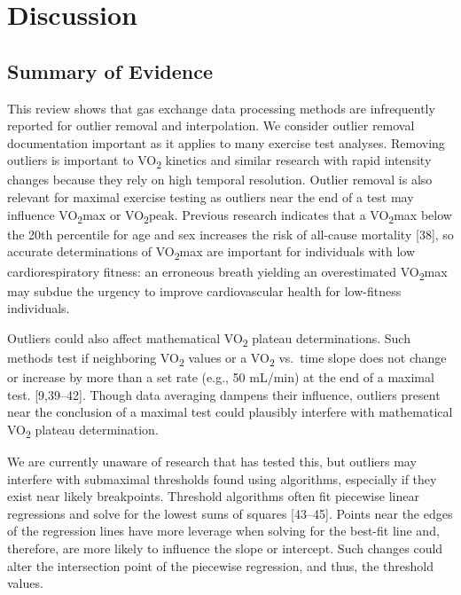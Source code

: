 \documentclass[
  letterpaper,
  DIV=11,
  numbers=noendperiod]{scrartcl}
\begin{document}
\section{Discussion}\label{sec-discussion}

\subsection{Summary of Evidence}\label{summary-of-evidence}

This review shows that gas exchange data processing methods are
infrequently reported for outlier removal and interpolation. We consider
outlier removal documentation important as it applies to many exercise
test analyses. Removing outliers is important to VO\textsubscript{2}
kinetics and similar research with rapid intensity changes because they
rely on high temporal resolution. Outlier removal is also relevant for
maximal exercise testing as outliers near the end of a test may
influence VO\textsubscript{2}max or VO\textsubscript{2}peak. Previous
research indicates that a VO\textsubscript{2}max below the 20th
percentile for age and sex increases the risk of all-cause mortality
{[}38{]}, so accurate determinations of VO\textsubscript{2}max are
important for individuals with low cardiorespiratory fitness: an
erroneous breath yielding an overestimated VO\textsubscript{2}max may
subdue the urgency to improve cardiovascular health for low-fitness
individuals.

Outliers could also affect mathematical VO\textsubscript{2} plateau
determinations. Such methods test if neighboring VO\textsubscript{2}
values or a VO\textsubscript{2} vs.~time slope does not change or
increase by more than a set rate (e.g., 50 mL/min) at the end of a
maximal test. {[}9,39--42{]}. Though data averaging dampens their
influence, outliers present near the conclusion of a maximal test could
plausibly interfere with mathematical VO\textsubscript{2} plateau
determination.

We are currently unaware of research that has tested this, but outliers
may interfere with submaximal thresholds found using algorithms,
especially if they exist near likely breakpoints. Threshold algorithms
often fit piecewise linear regressions and solve for the lowest sums of
squares {[}43--45{]}. Points near the edges of the regression lines have
more leverage when solving for the best-fit line and, therefore, are
more likely to influence the slope or intercept. Such changes could
alter the intersection point of the piecewise regression, and thus, the
threshold values.
\end{document}
